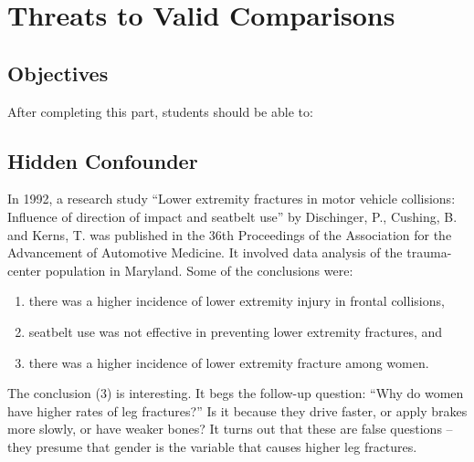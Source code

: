 \documentclass[11pt, chapterprefix=true]{scrbook}\usepackage[]{graphicx}\usepackage[]{color}
\begin{document}
\onecolumn



\chapter{Threats to Valid Comparisons}
\label{chap:ch4}

\section{Objectives}

After completing this part, students should be able to:


\section{Hidden Confounder}  

In 1992, a research study ``Lower extremity fractures in motor vehicle collisions:
Influence of direction of impact and seatbelt use'' by Dischinger, P., Cushing, B. and Kerns, T. was published in the 36th Proceedings of the Association for the Advancement of Automotive Medicine.  It involved data analysis of the trauma-center population in Maryland.  Some of the conclusions were:

\begin{enumerate}
   \item there was a higher incidence of lower extremity injury in frontal collisions,
   \item seatbelt use was not effective in preventing lower extremity fractures, and
   \item there was a higher incidence of lower extremity fracture among women.
\end{enumerate}

The conclusion (3) is interesting.  It begs the follow-up question: ``Why do women have higher rates of leg fractures?''  Is it because they drive faster, or apply brakes more slowly, or have weaker bones?  It turns out that these are false questions -- they presume that gender is the variable that causes higher leg fractures.  
\end{document}
